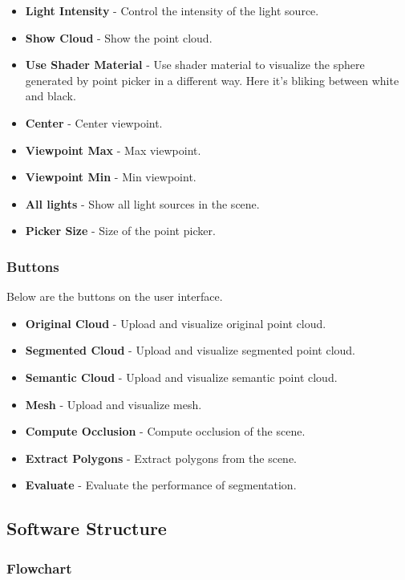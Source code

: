 \documentclass[11pt, a4paper,oneside,chapterprefix=false]{scrbook}
\begin{document}
\begin{itemize}
	\item \textbf{Light Intensity} - Control the intensity of the light source.
	\item \textbf{Show Cloud} - Show the point cloud.
	\item \textbf{Use Shader Material} - Use shader material to visualize the sphere generated by point picker in a different way. Here it's bliking between white and black.
	\item \textbf{Center} - Center viewpoint.
	\item \textbf{Viewpoint Max} - Max viewpoint.
	\item \textbf{Viewpoint Min} - Min viewpoint.
	\item \textbf{All lights} - Show all light sources in the scene.
	\item \textbf{Picker Size} - Size of the point picker.
\end{itemize}

\subsubsection{Buttons}

Below are the buttons on the user interface.

\begin{itemize}
	\item \textbf{Original Cloud} - Upload and visualize original point cloud.
	\item \textbf{Segmented Cloud} - Upload and visualize segmented point cloud.
	\item \textbf{Semantic Cloud} - Upload and visualize semantic point cloud.
	\item \textbf{Mesh} - Upload and visualize mesh.
	\item \textbf{Compute Occlusion} - Compute occlusion of the scene.
	\item \textbf{Extract Polygons} - Extract polygons from the scene.
	\item \textbf{Evaluate} - Evaluate the performance of segmentation.
\end{itemize}

\subsection{Software Structure}

\subsubsection{Flowchart}
\end{document}
